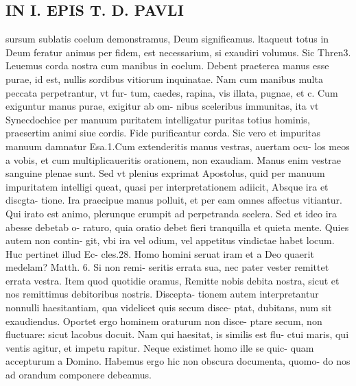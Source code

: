 \documentclass{article}
\begin{document}
\begin{pages}
\section*{IN I. EPIS T. D. PAVLI }
\marginpar{[ p.70 ]}\pstart sursum sublatis coelum demonstramus, Deum significamus. ltaqueut totus in Deum feratur animus per fidem, est necessarium, si exaudiri volumus. Sic Thren3. Leuemus corda nostra cum manibus in coelum. Debent praeterea manus esse purae, id est, nullis sordibus vitiorum inquinatae. Nam cum manibus multa peccata perpetrantur, vt fur- tum, caedes, rapina, vis illata, pugnae, et c. Cum exiguntur manus purae, exigitur ab om- nibus sceleribus immunitas, ita vt Synecdochice per manuum puritatem intelligatur puritas totius hominis, praesertim animi siue cordis. Fide purificantur corda. Sic vero et impuritas manuum damnatur Esa.1.Cum extenderitis manus vestras, auertam ocu- los meos a vobis, et cum multiplicaueritis orationem, non exaudiam. Manus enim    vestrae sanguine plenae sunt. Sed vt plenius exprimat Apostolus, quid per manuum impuritatem intelligi queat, quasi per interpretationem adiicit, Absque ira et discgta- tione. Ira praecipue manus polluit, et per eam omnes affectus vitiantur. Qui irato est animo, plerunque erumpit ad perpetranda scelera. Sed et ideo ira abesse debetab o- raturo, quia oratio debet fieri tranquilla et quieta mente. Quies autem non contin- git, vbi ira vel odium, vel appetitus vindictae habet locum. Huc pertinet illud Ec- cles.28. Homo homini seruat iram et a Deo quaerit medelam? Matth. 6. Si non remi- seritis errata sua, nec pater vester remittet errata vestra. Item quod quotidie oramus, Remitte nobis debita nostra, sicut et nos remittimus debitoribus nostris. Discepta- tionem autem interpretantur nonnulli haesitantiam, qua videlicet quis secum disce- ptat, dubitans, num sit exaudiendus. Oportet ergo hominem oraturum non disce- ptare secum, non fluctuare: sicut lacobus docuit. Nam qui haesitat, is similis est flu- ctui maris, qui ventis agitur, et impetu rapitur. Neque existimet homo ille se quic- quam accepturum a Domino. Habemus ergo hic non obscura documenta, quomo- do nos ad orandum componere debeamus.  \pend
{}
{}

\end{pages}
\end{document}
